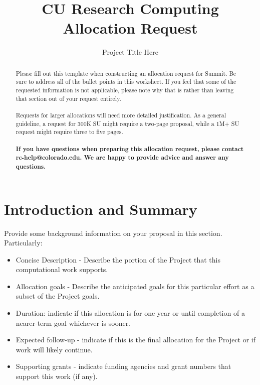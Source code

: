 \documentclass[10pt, letterpaper]{article}
\begin{document}
\title{CU Research Computing Allocation Request}
\author{Project Title Here}
\date{}
\maketitle


\begin{abstract}
\noindent Please fill out this template when constructing an allocation request for Summit.  Be sure to address all of the bullet points in this worksheet. If you feel that some of the requested information is not applicable, please note why that is rather than leaving that section out of your request entirely.
\\
\\
\noindent Requests for larger allocations will need more detailed justification. As a general guideline, a request for 300K SU might require a two-page proposal, while a 1M+ SU request might require three to five pages.
\\
\\
\noindent \textbf{If you have questions when preparing this allocation request, please contact rc-help@colorado.edu.  We are happy to provide advice and answer any questions.}

\end{abstract}
\section{Introduction and Summary}\label{sec:intro}
Provide some background information on your proposal in this section.  Particularly:

\begin{itemize}
\item Concise Description - Describe the portion of the Project that this computational work supports.
\item Allocation goals - Describe the anticipated goals for this particular effort as a subset of the Project goals.
\item Duration: indicate if this allocation is for one year or until completion of a nearer-term goal whichever is sooner.
\item Expected follow-up - indicate if this is the final allocation for the Project or if work will likely continue.
\item Supporting grants - indicate funding agencies and grant numbers that support this work (if any).
\end{itemize}
\end{document}
